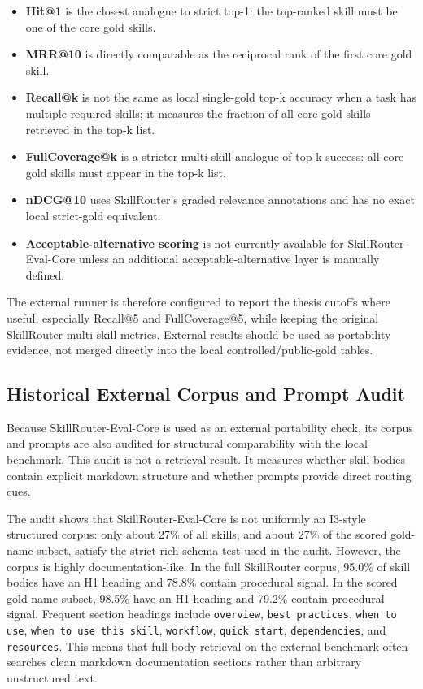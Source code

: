 \begin{itemize}
  \item \textbf{Hit@1} is the closest analogue to strict top-1: the top-ranked skill must be one of the core gold skills.
  \item \textbf{MRR@10} is directly comparable as the reciprocal rank of the first core gold skill.
  \item \textbf{Recall@k} is not the same as local single-gold top-k accuracy when a task has multiple required skills; it measures the fraction of all core gold skills retrieved in the top-k list.
  \item \textbf{FullCoverage@k} is a stricter multi-skill analogue of top-k success: all core gold skills must appear in the top-k list.
  \item \textbf{nDCG@10} uses SkillRouter's graded relevance annotations and has no exact local strict-gold equivalent.
  \item \textbf{Acceptable-alternative scoring} is not currently available for SkillRouter-Eval-Core unless an additional acceptable-alternative layer is manually defined.
\end{itemize}

The external runner is therefore configured to report the thesis cutoffs where useful, especially Recall@5 and FullCoverage@5, while keeping the original SkillRouter multi-skill metrics. External results should be used as portability evidence, not merged directly into the local controlled/public-gold tables.

\subsection{Historical External Corpus and Prompt Audit}

Because SkillRouter-Eval-Core is used as an external portability check, its corpus and prompts are also audited for structural comparability with the local benchmark. This audit is not a retrieval result. It measures whether skill bodies contain explicit markdown structure and whether prompts provide direct routing cues.

The audit shows that SkillRouter-Eval-Core is not uniformly an I3-style structured corpus: only about 27\% of all skills, and about 27\% of the scored gold-name subset, satisfy the strict rich-schema test used in the audit. However, the corpus is highly documentation-like. In the full SkillRouter corpus, 95.0\% of skill bodies have an H1 heading and 78.8\% contain procedural signal. In the scored gold-name subset, 98.5\% have an H1 heading and 79.2\% contain procedural signal. Frequent section headings include \texttt{overview}, \texttt{best practices}, \texttt{when to use}, \texttt{when to use this skill}, \texttt{workflow}, \texttt{quick start}, \texttt{dependencies}, and \texttt{resources}. This means that full-body retrieval on the external benchmark often searches clean markdown documentation sections rather than arbitrary unstructured text.

